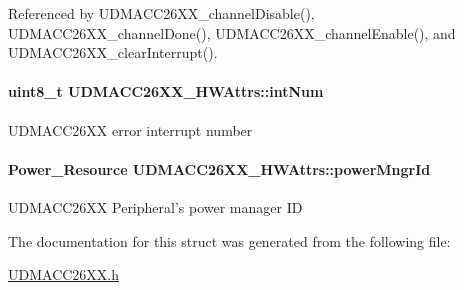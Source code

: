 Referenced by U\-D\-M\-A\-C\-C26\-X\-X\-\_\-channel\-Disable(), U\-D\-M\-A\-C\-C26\-X\-X\-\_\-channel\-Done(), U\-D\-M\-A\-C\-C26\-X\-X\-\_\-channel\-Enable(), and U\-D\-M\-A\-C\-C26\-X\-X\-\_\-clear\-Interrupt().

\paragraph[{int\-Num}]{\setlength{\rightskip}{0pt plus 5cm}uint8\-\_\-t U\-D\-M\-A\-C\-C26\-X\-X\-\_\-\-H\-W\-Attrs\-::int\-Num}\label{struct_u_d_m_a_c_c26_x_x___h_w_attrs_a842b5f7c2c0a2563eaf6f037cff07785}
U\-D\-M\-A\-C\-C26\-X\-X error interrupt number 
\paragraph[{power\-Mngr\-Id}]{\setlength{\rightskip}{0pt plus 5cm}Power\-\_\-\-Resource U\-D\-M\-A\-C\-C26\-X\-X\-\_\-\-H\-W\-Attrs\-::power\-Mngr\-Id}\label{struct_u_d_m_a_c_c26_x_x___h_w_attrs_a3dd30c452d16f3ffa55696fc15852c0b}
U\-D\-M\-A\-C\-C26\-X\-X Peripheral's power manager I\-D 

The documentation for this struct was generated from the following file\-:\begin{DoxyCompactItemize}
\item 
\hyperlink{_u_d_m_a_c_c26_x_x_8h}{U\-D\-M\-A\-C\-C26\-X\-X.\-h}\end{DoxyCompactItemize}
